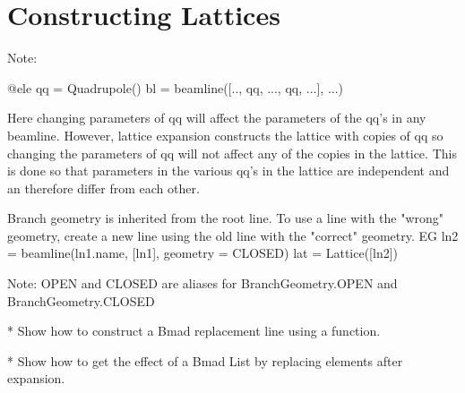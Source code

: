 \chapter{Constructing Lattices}
\label{c:construct-lat}

Note: 
\begin{example}
  @ele qq = Quadrupole()
  bl = beamline([.., qq, ..., qq, ...], ...)
\end{example}
Here changing parameters of qq will affect the parameters of the qq's in any beamline.
However, lattice expansion constructs the lattice with copies of qq so changing the
parameters of qq will not affect any of the copies in the lattice. This is done so that
parameters in the various qq's in the lattice are independent and an therefore differ from each
other. 

Branch geometry is inherited from the root line. To use a line with the "wrong" geometry, create
a new line using the old line with the "correct" geometry. EG
  ln2 = beamline(ln1.name, [ln1], geometry = CLOSED)
  lat = Lattice([ln2])

Note: OPEN and CLOSED are aliases for BranchGeometry.OPEN and BranchGeometry.CLOSED

* Show how to construct a Bmad replacement line using a function.

* Show how to get the effect of a Bmad List by replacing elements after expansion.
